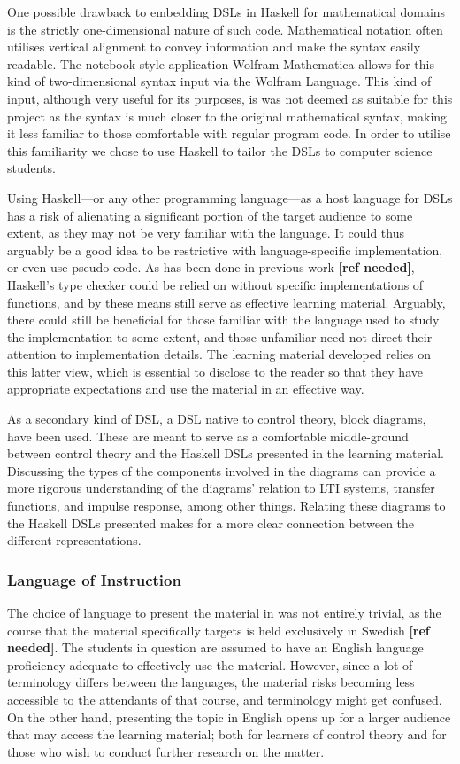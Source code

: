 One possible drawback to embedding DSLs in Haskell for mathematical domains is the strictly one-dimensional nature of such code. Mathematical notation often utilises vertical alignment to convey information and make the syntax easily readable. The notebook-style application Wolfram Mathematica allows for this kind of two-dimensional syntax input via the Wolfram Language. This kind of input, although very useful for its purposes, is was not deemed as suitable for this project as the syntax is much closer to the original mathematical syntax, making it less familiar to those comfortable with regular program code. In order to utilise this familiarity we chose to use Haskell to tailor the DSLs to computer science students. 

Using Haskell---or any other programming language---as a host language for DSLs has a risk of alienating a significant portion of the target audience to some extent, as they may not be very familiar with the language. It could thus arguably be a good idea to be restrictive with language-specific implementation, or even use pseudo-code. As has been done in previous work \textbf{[ref needed]}, Haskell's type checker could be relied on without specific implementations of functions, and by these means still serve as effective learning material. Arguably, there could still be beneficial for those familiar with the language used to study the implementation to some extent, and those unfamiliar need not direct their attention to implementation details. The learning material developed relies on this latter view, which is essential to disclose to the reader so that they have appropriate expectations and use the material in an effective way.

As a secondary kind of DSL, a DSL native to control theory, block diagrams, have been used. These are meant to serve as a comfortable middle-ground between control theory and the Haskell DSLs presented in the learning material. Discussing the types of the components involved in the diagrams can provide a more rigorous understanding of the diagrams' relation to LTI systems, transfer functions, and impulse response, among other things. Relating these diagrams to the Haskell DSLs presented makes for a more clear connection between the different representations. 



\subsubsection{Language of Instruction}
The choice of language to present the material in was not entirely trivial, as the course that the material specifically targets is held exclusively in Swedish \textbf{[ref needed]}. The students in question are assumed to have an English language proficiency adequate to effectively use the material. However, since a lot of terminology differs between the languages, the material risks becoming less accessible to the attendants of that course, and terminology might get confused. On the other hand, presenting the topic in English opens up for a larger audience that may access the learning material; both for learners of control theory and for those who wish to conduct further research on the matter. 

